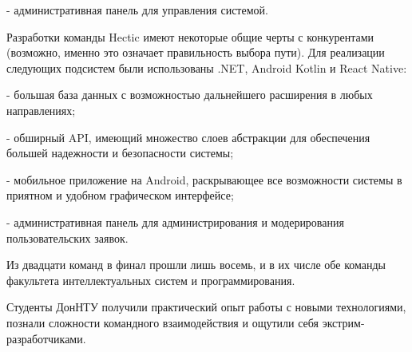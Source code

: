 - административная панель для управления системой.


Разработки команды Hectic имеют некоторые общие черты с конкурентами (возможно,
именно это означает правильность выбора пути). Для реализации следующих
подсистем были использованы .NET, Android Kotlin и React Native:

- большая база данных с возможностью дальнейшего расширения в любых
направлениях;

- обширный API, имеющий множество слоев абстракции для обеспечения большей
надежности и безопасности системы;

- мобильное приложение на Android, раскрывающее все возможности системы в
приятном и удобном графическом интерфейсе;

- административная панель для  администрирования и модерирования
пользовательских заявок.

Из двадцати команд в финал прошли лишь восемь, и в их числе обе команды
факультета интеллектуальных систем и программирования.

Студенты ДонНТУ получили практический опыт работы с новыми технологиями,
познали сложности командного взаимодействия и ощутили себя
экстрим-разработчиками.
